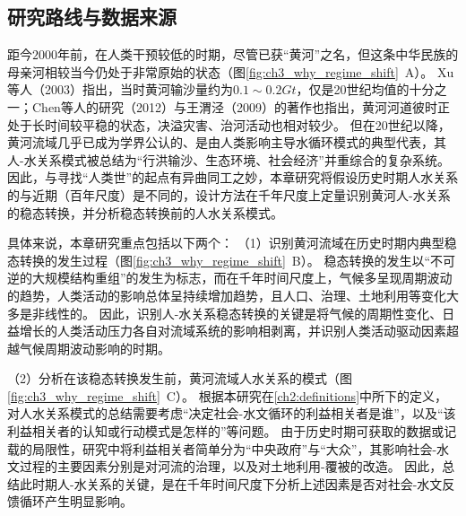 \subsection{研究路线与数据来源}


距今$2000$年前，在人类干预较低的时期，尽管已获“黄河”之名，但这条中华民族的母亲河相较当今仍处于非常原始的状态（图\ref{fig:ch3_why_regime_shift}~A）。
Xu等人（2003）\cite{xu2003a}指出，当时黄河输沙量约为$0.1\sim0.2 Gt$，仅是20世纪均值的十分之一；Chen等人的研究（2012）\cite{chen2012}与王渭泾（2009）\cite{WangWeiJing2009}的著作也指出，黄河河道彼时正处于长时间较平稳的状态，决溢灾害、治河活动也相对较少。
但在20世纪以降，黄河流域几乎已成为学界公认的、是由人类影响主导水循环模式的典型代表，其人-水关系模式被总结为“行洪输沙、生态环境、社会经济”并重综合的复杂系统\cite{jiang2020b}。
因此，与寻找“人类世”的起点有异曲同工之妙，本章研究将假设历史时期人水关系的与近期（百年尺度）是不同的，设计方法在千年尺度上定量识别黄河人-水关系的稳态转换，并分析稳态转换前的人水关系模式。

具体来说，本章研究重点包括以下两个：
（1）识别黄河流域在历史时期内典型稳态转换的发生过程（图\ref{fig:ch3_why_regime_shift}~B）。
稳态转换的发生以“不可逆的大规模结构重组”的发生为标志，而在千年时间尺度上，气候多呈现周期波动的趋势，人类活动的影响总体呈持续增加趋势，且人口、治理、土地利用等变化大多是非线性的\cite{GeQuanSheng2011}。
因此，识别人-水关系稳态转换的关键是将气候的周期性变化、日益增长的人类活动压力各自对流域系统的影响相剥离，并识别人类活动驱动因素超越气候周期波动影响的时期。

（2）分析在该稳态转换发生前，黄河流域人水关系的模式（图\ref{fig:ch3_why_regime_shift}~C）。
根据本研究在\ref{ch2:definitions}中所下的定义，对人水关系模式的总结需要考虑“决定社会-水文循环的利益相关者是谁”，以及“该利益相关者的认知或行动模式是怎样的”等问题。
由于历史时期可获取的数据或记载的局限性，研究中将利益相关者简单分为“中央政府”与“大众”，其影响社会-水文过程的主要因素分别是对河流的治理，以及对土地利用-覆被的改造。
因此，总结此时期人-水关系的关键，是在千年时间尺度下分析上述因素是否对社会-水文反馈循环产生明显影响。

